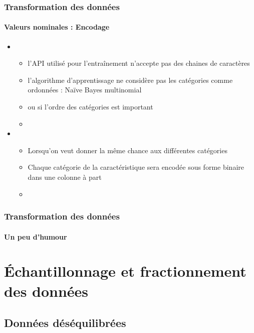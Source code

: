 \documentclass[xcolor=table]{beamer}
\begin{document}
\begin{frame}
	\frametitle{Transformation des données}
	\framesubtitle{Valeurs nominales : Encodage}
	
	\begin{itemize}
		\item {}
		\begin{itemize}
			\item l'API utilisé pour l'entraînement n'accepte pas des chaines de caractères
			\item l'algorithme d'apprentissage ne considère pas les catégories comme ordonnées : Naïve Bayes multinomial 
			\item ou si l'ordre des catégories est important
			\item {}
		\end{itemize}
		\item {}
		\begin{itemize}
			\item Lorsqu'on veut donner la même chance aux différentes catégories
			\item Chaque catégorie de la caractéristique sera encodée sous forme binaire dans une colonne à part
			\item {}
		\end{itemize}
	\end{itemize}
	
\end{frame}

\begin{frame}
	\frametitle{Transformation des données}
	\framesubtitle{Un peu d'humour}
	
	\begin{center}
	\end{center}
	
\end{frame}

\section{Échantillonnage et fractionnement des données}

%	

\subsection{Données déséquilibrées}
\end{document}
